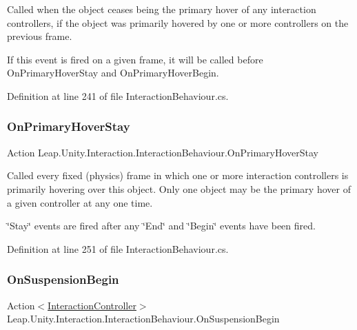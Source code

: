 Called when the object ceases being the primary hover of any interaction controllers, if the object was primarily hovered by one or more controllers on the previous frame. 

If this event is fired on a given frame, it will be called before On\+Primary\+Hover\+Stay and On\+Primary\+Hover\+Begin. 

Definition at line 241 of file Interaction\+Behaviour.\+cs.

\mbox{\label{class_leap_1_1_unity_1_1_interaction_1_1_interaction_behaviour_a0f4557ef35de620c7f19128c2e47fbd0}} 
\subsubsection{\texorpdfstring{OnPrimaryHoverStay}{OnPrimaryHoverStay}}
{\footnotesize\ttfamily Action Leap.\+Unity.\+Interaction.\+Interaction\+Behaviour.\+On\+Primary\+Hover\+Stay}



Called every fixed (physics) frame in which one or more interaction controllers is primarily hovering over this object. Only one object may be the primary hover of a given controller at any one time. 

\char`\"{}\+Stay\char`\"{} events are fired after any \char`\"{}\+End\char`\"{} and \char`\"{}\+Begin\char`\"{} events have been fired. 

Definition at line 251 of file Interaction\+Behaviour.\+cs.

\mbox{\label{class_leap_1_1_unity_1_1_interaction_1_1_interaction_behaviour_a0aafa1ff61acea921ddb1eb002f4be89}} 
\subsubsection{\texorpdfstring{OnSuspensionBegin}{OnSuspensionBegin}}
{\footnotesize\ttfamily Action$<$\mbox{\hyperlink{class_leap_1_1_unity_1_1_interaction_1_1_interaction_controller}{Interaction\+Controller}}$>$ Leap.\+Unity.\+Interaction.\+Interaction\+Behaviour.\+On\+Suspension\+Begin}



